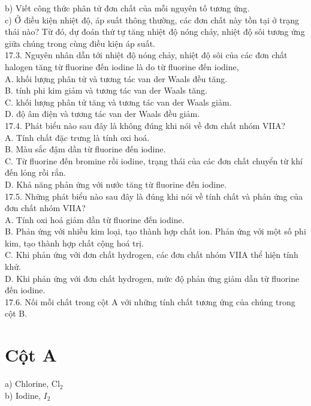 \documentclass[10pt]{article}
\begin{document}
b) Viết công thức phân tử đơn chất của mỗi nguyên tố tương ứng.\\
c) Ở điều kiện nhiệt độ, áp suất thông thường, các đơn chất này tồn tại ở trạng thái nào? Từ đó, dự đoán thứ tự tăng nhiệt độ nóng chảy, nhiệt độ sôi tương ứng giữa chúng trong cùng điều kiện áp suất.\\
17.3. Nguyên nhân dẫn tới nhiệt độ nóng chảy, nhiệt độ sôi của các đơn chất halogen tăng từ fluorine đến iodine là do từ fluorine đến iodine,\\
A. khối lượng phân tử và tương tác van der Waals đều tăng.\\
B. tính phi kim giảm và tương tác van der Waals tăng.\\
C. khối lượng phân tử tăng và tương tác van der Waals giảm.\\
D. độ âm điện và tương tác van der Waals đều giảm.\\
17.4. Phát biểu nào sau đây là không đúng khi nói về đơn chất nhóm VIIA?\\
A. Tính chất đặc trưng là tính oxi hoá.\\
B. Màu sắc đậm dần từ fluorine đến iodine.\\
C. Từ fluorine đến bromine rồi iodine, trạng thái của các đơn chất chuyển từ khí đến lỏng rồi rắn.\\
D. Khả năng phản ứng với nước tăng từ fluorine đến iodine.\\
17.5. Những phát biểu nào sau đây là đúng khi nói về tính chất và phản ứng của đơn chất nhóm VIIA?\\
A. Tính oxi hoá giảm dần từ fluorine đến iodine.\\
B. Phản ứng với nhiều kim loại, tạo thành hợp chất ion. Phản ứng với một số phi kim, tạo thành hợp chất cộng hoá trị.\\
C. Khi phản ứng với đơn chất hydrogen, các đơn chất nhóm VIIA thể hiện tính khử.\\
D. Khi phản ứng với đơn chất hydrogen, mức độ phản ứng giảm dần từ fluorine đến iodine.\\
17.6. Nối mỗi chất trong cột A với những tính chất tương ứng của chúng trong cột B.

\section*{Cột A}
a) Chlorine, $\mathrm{Cl}_{2}$\\
b) Iodine, $I_{2}$
\end{document}
